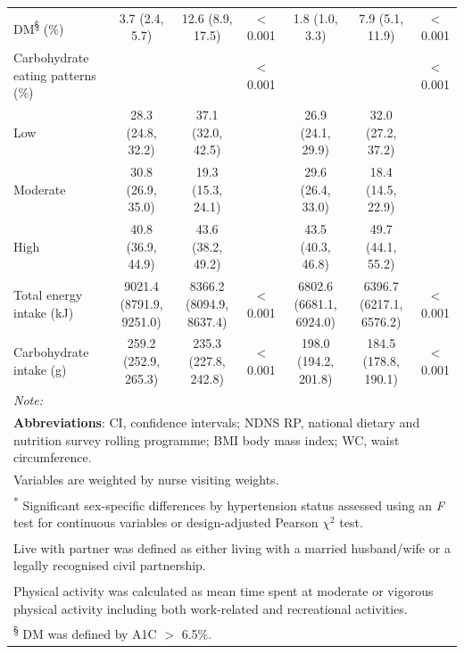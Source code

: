 \begin{table}
\begin{tabular}[t]{lcccccc}
		DM\textsuperscript{\S} (\%) & 3.7 (2.4, 5.7) & 12.6 (8.9, 17.5) & < 0.001 & 1.8 (1.0, 3.3) & 7.9 (5.1, 11.9) & < 0.001 \\ 
		Carbohydrate eating patterns (\%) &  &  & < 0.001 &  &  & < 0.001\\
		\hspace{1em}Low & 28.3 (24.8, 32.2) & 37.1 (32.0, 42.5) &  & 26.9 (24.1, 29.9) & 32.0 (27.2, 37.2) & \\
		\hspace{1em}Moderate & 30.8 (26.9, 35.0) & 19.3 (15.3, 24.1) &  & 29.6 (26.4, 33.0) & 18.4 (14.5, 22.9) & \\
		\hspace{1em}High & 40.8 (36.9, 44.9) & 43.6 (38.2, 49.2) &  & 43.5 (40.3, 46.8) & 49.7 (44.1, 55.2) & \\
		Total energy intake (kJ) & 9021.4 (8791.9, 9251.0) & 8366.2 (8094.9, 8637.4) & < 0.001 & 6802.6 (6681.1, 6924.0) & 6396.7 (6217.1, 6576.2) & < 0.001\\
		Carbohydrate intake (g) & 259.2 (252.9, 265.3) & 235.3 (227.8, 242.8) & < 0.001 & 198.0 (194.2, 201.8) & 184.5 (178.8, 190.1) & < 0.001\\
		\bottomrule
		\multicolumn{7}{l}{{\scriptsize \textit{Note: }}}\\
		\multicolumn{7}{l}{{\scriptsize \textbf{Abbreviations}: CI, confidence intervals; NDNS RP, national dietary and nutrition survey rolling programme; BMI body mass index; WC, waist circumference.}}\\
		\multicolumn{7}{l}{{\scriptsize Variables are weighted by nurse visiting weights.}}\\
		\multicolumn{7}{l}{{\scriptsize \textsuperscript{*} Significant sex-specific differences by hypertension status assessed using an \textit{F} test for continuous variables or design-adjusted Pearson $\chi^2$ test.}}\\
		\multicolumn{7}{l}{{\scriptsize \textsuperscript{\ddag} Live with partner was defined as either living with a married husband/wife or a legally recognised civil partnership.}}\\
		\multicolumn{7}{l}{{\scriptsize \textsuperscript{\dag} Physical activity was calculated as mean time spent at moderate or vigorous physical activity including both work-related and recreational activities.}}\\
		\multicolumn{7}{l}{{\scriptsize \textsuperscript{\S}  DM was defined by A1C $>$ 6.5\%.}}
	\end{tabular}
\end{table}




